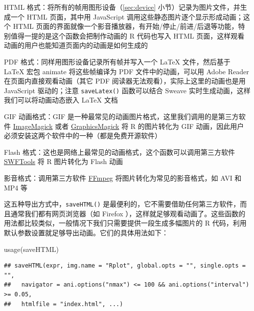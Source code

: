 \documentclass[
  b5paper,
  UTF8,twoside]{book}
\newenvironment{Shaded}{\begin{snugshade}}{\end{snugshade}}
\newcommand{\FunctionTok}[1]{\textcolor[rgb]{0.00,0.00,0.00}{#1}}
\newcommand{\NormalTok}[1]{#1}
\providecommand{\tightlist}{%
  \setlength{\itemsep}{0pt}\setlength{\parskip}{0pt}}
\begin{document}
\begin{description}
\tightlist
\item[\texttt{saveHTML()}]
HTML 格式：将所有的帧用图形设备（\ref{sec:device} 小节）记录为图片文件，并生成一个 HTML 页面，其中用 JavaScript 调用这些静态图片逐个显示形成动画；这个 HTML 页面的界面就像一个影音播放器，有开始/停止/前进/后退等功能，特别值得一提的是这个函数会把制作动画的 R 代码也写入 HTML 页面，这样观看动画的用户也能知道页面内的动画是如何生成的
\item[\texttt{saveLatex()}]
PDF 格式：同样用图形设备记录所有帧并写入一个 LaTeX 文件，然后基于 LaTeX 宏包 animate 将这些帧编译为 PDF 文件中的动画，可以用 Adobe Reader 在页面内直接观看动画（其它 PDF 阅读器无法观看），实际上这里的动画也是用 JavaScript 驱动的；注意 \texttt{saveLatex()} 函数可以结合 Sweave 实时生成动画，这样我们可以将动画动态嵌入 LaTeX 文档
\item[\texttt{saveGIF()}]
GIF 动画格式：GIF 是一种最常见的动画图片格式，这里我们调用的是第三方软件 \href{https://imagemagick.org/}{ImageMagick} 或者 \href{http://www.graphicsmagick.org}{GraphicsMagick} 将 R 的图片转化为 GIF 动画，因此用户必须安装这两个软件中的一种（都是免费开源软件）
\item[\texttt{saveSWF()}]
Flash 格式：这也是网络上最常见的动画格式，这个函数可以调用第三方软件 \href{http://swftools.org}{SWFTools} 将 R 图片转化为 Flash 动画
\item[\texttt{saveVideo()}]
影音格式：调用第三方软件 \href{https://ffmpeg.org/}{FFmpeg} 将图片转化为常见的影音格式，如 AVI 和 MP4 等
\end{description}

这五种导出方式中，\texttt{saveHTML()} 是最便利的，它不需要借助任何第三方软件，而且通常我们都有网页浏览器（如 Firefox ），这样就足够观看动画了。这些函数的用法都比较类似，一般情况下我们只需要提供一段生成多幅图片的 R 代码，利用默认参数设置就足够导出动画。它们的具体用法如下：

\begin{Shaded}
\begin{Highlighting}[]
\FunctionTok{usage}\NormalTok{(saveHTML)}
\end{Highlighting}
\end{Shaded}

\begin{verbatim}
## saveHTML(expr, img.name = "Rplot", global.opts = "", single.opts = "",
##   navigator = ani.options("nmax") <= 100 && ani.options("interval") >= 0.05,
##   htmlfile = "index.html", ...)
\end{verbatim}
\end{document}
